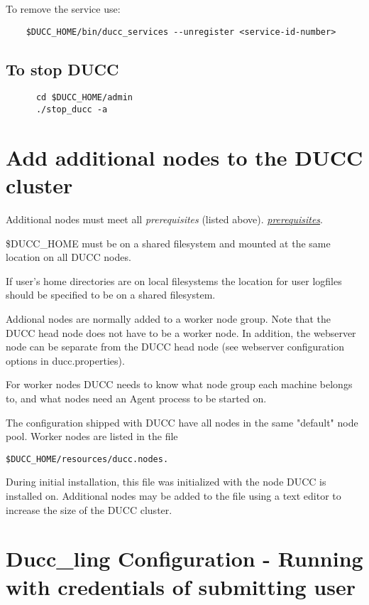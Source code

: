    To remove the service use:
    \begin{verbatim}
    $DUCC_HOME/bin/ducc_services --unregister <service-id-number>
    \end{verbatim}

\subsection{To stop DUCC}
    \begin{verbatim}
      cd $DUCC_HOME/admin
      ./stop_ducc -a
    \end{verbatim}
      

\section{Add additional nodes to the DUCC cluster}
   Additional nodes must meet all 
   \ifdefined\DUCCSTANDALONE
   {\em prerequisites} (listed above).
   \else
   \hyperref[sec:install.prerequisites]{\em prerequisites}.
   \fi

   \$DUCC\_HOME must be on a shared filesystem and mounted at the same location
   on all DUCC nodes.

   If user's home directories are on local filesystems the location for user logfiles
   should be specified to be on a shared filesystem. 

   Addional nodes are normally added to a worker node group. Note that the
   DUCC head node does not have to be a worker node.
   In addition, the webserver node can be separate from the DUCC head node 
   (see webserver configuration options in ducc.properties).

   For worker nodes DUCC needs to know what node group
   each machine belongs to, and what nodes need an Agent process to be started on.

   The configuration shipped with DUCC have all nodes in the same "default" node pool.
   Worker nodes are listed in the file
\begin{verbatim}
$DUCC_HOME/resources/ducc.nodes.  
\end{verbatim}
   
   During initial installation, this file was initialized with the node DUCC is installed on.
   Additional nodes may be added to the file using a text editor to increase the size of the DUCC
   cluster.


\section{Ducc\_ling Configuration - Running with credentials of submitting user}
\label{sec:duccling.install}

